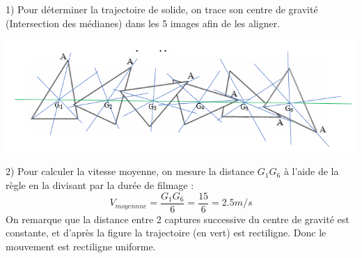 \documentclass[10pt]{beamer}
\begin{document}

\begin{frame}
\begin{alertblock}{}
1)	Pour déterminer la trajectoire de solide, on trace son centre de gravité (Intersection des médianes) dans les 5 images afin de les aligner.
\end{alertblock}
\begin{center}
\includegraphics[scale=0.5]{solide 2.PNG} 
\end{center}
\end{frame}

\begin{frame}
\begin{alertblock}{}
2)	Pour calculer la vitesse moyenne, on mesure la distance $G_{1}G_{6}$ à l’aide de la règle en la divisant par la durée de filmage :
$$V_{moyennne} = \dfrac{G_{1}G_{6}}{6} = \frac{15}{6} = 2.5 m/s$$
On remarque que la distance entre 2 captures successive du centre de gravité est constante, et d’après la figure la trajectoire (en vert) est rectiligne. Donc le mouvement est rectiligne uniforme.
\end{alertblock}
\end{frame}
\end{document}
